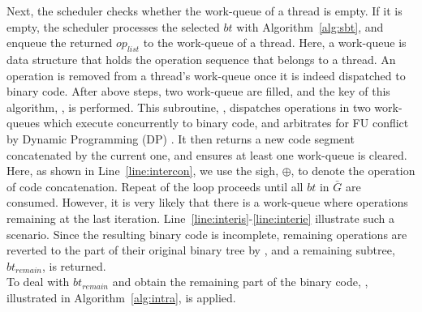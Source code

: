         Next, the scheduler checks whether the work-queue of a thread is empty.
        If it is empty, the scheduler processes the selected $bt$ with Algorithm~\ref{alg:sbt}, 
        and enqueue the returned $op_{list}$ to the work-queue of a thread.
        Here, a work-queue is data structure that holds the operation sequence that belongs to a thread.
        An operation is removed from a thread's work-queue once it is indeed dispatched to binary code.
        After above steps, two work-queue are filled, and the key of this algorithm, , is performed.
        This subroutine, , dispatches operations in two work-queues which execute concurrently to binary code, 
        and arbitrates for FU conflict by Dynamic Programming (DP) \cite{dp}.
        It then returns a new code segment concatenated by the current one, and ensures at least one work-queue is cleared.
        Here, as shown in Line~\ref{line:intercon}, we use the sigh, $\oplus$, to denote the operation of code concatenation.
        Repeat of the loop proceeds until all $bt$ in $\bar{G}$ are consumed.
        However, it is very likely that there is a work-queue where operations remaining at the last iteration.
        Line~\ref{line:interis}-\ref{line:interie} illustrate such a scenario.
        Since the resulting binary code is incomplete, 
        remaining operations are reverted to the part of their original binary tree by ,
        and a remaining subtree, $bt_{remain}$, is returned.
        \\\indent 
        To deal with $bt_{remain}$ and obtain the remaining part of the binary code, 
        , illustrated in Algorithm~\ref{alg:intra}, is applied.
